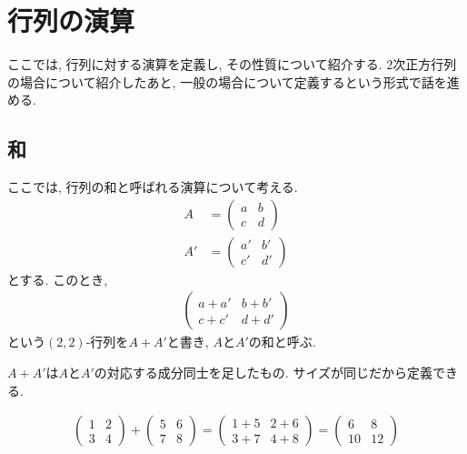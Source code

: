 \section{行列の演算}
\label{sec:def:matop}
ここでは,
行列に対する演算を定義し, その性質について紹介する.
$2$次正方行列の場合について紹介したあと,
一般の場合について定義するという形式で話を進める.

\subsection{和}
ここでは, 行列の和と呼ばれる演算について考える.
\begin{align*}
  A&=
  \begin{pmatrix}
    a&b\\c&d
  \end{pmatrix}\\
  A'&=
  \begin{pmatrix}
    a'&b'\\c'&d'
  \end{pmatrix}
\end{align*}
とする.
このとき,
\begin{align*}
  \begin{pmatrix}
    a+a'&b+b'\\c+c'&d+d'
  \end{pmatrix}
\end{align*}
という$(2,2)$-行列を$A+A'$と書き,
$A$と$A'$の和と呼ぶ.
\begin{remark}
  $A+A'$は$A$と$A'$の対応する成分同士を足したもの.
  サイズが同じだから定義できる.
\end{remark}
\begin{example}
  \begin{align*}
  \begin{pmatrix}
    1&2\\3&4
  \end{pmatrix}+
  \begin{pmatrix}
    5&6\\7&8
  \end{pmatrix}
 =
  \begin{pmatrix}
    1+5&2+6\\3+7&4+8
  \end{pmatrix}
 =
  \begin{pmatrix}
    6&8\\10&12
  \end{pmatrix}
  \end{align*}
\end{example}

